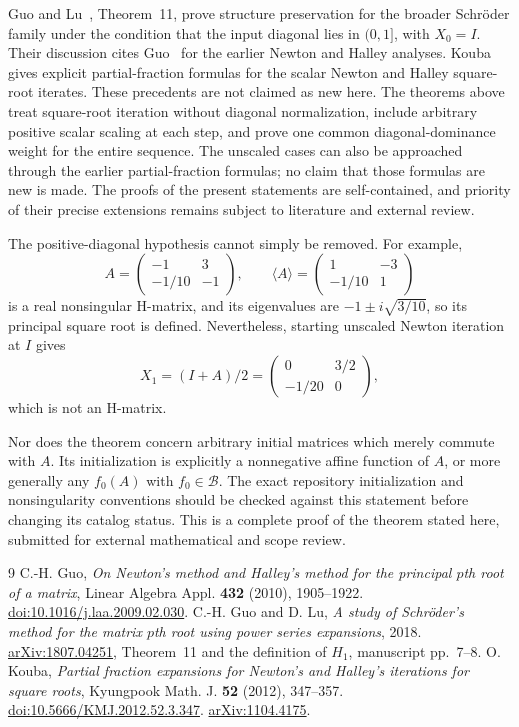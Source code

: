 \documentclass[11pt]{article}
\newcommand{\comp}[1]{\langle #1\rangle}
\begin{document}
Guo and Lu~\cite{GL}, Theorem~11, prove structure preservation for the broader Schr\"oder family under the condition that the input diagonal lies in $(0,1]$, with $X_0=I$. Their discussion cites Guo~\cite{G} for the earlier Newton and Halley analyses. Kouba~\cite{K} gives explicit partial-fraction formulas for the scalar Newton and Halley square-root iterates. These precedents are not claimed as new here. The theorems above treat square-root iteration without diagonal normalization, include arbitrary positive scalar scaling at each step, and prove one common diagonal-dominance weight for the entire sequence. The unscaled cases can also be approached through the earlier partial-fraction formulas; no claim that those formulas are new is made. The proofs of the present statements are self-contained, and priority of their precise extensions remains subject to literature and external review.

The positive-diagonal hypothesis cannot simply be removed. For example,
\[
A=\begin{pmatrix}-1&3\\-1/10&-1\end{pmatrix},\qquad
\comp A=\begin{pmatrix}1&-3\\-1/10&1\end{pmatrix}
\]
is a real nonsingular H-matrix, and its eigenvalues are $-1\pm i\sqrt{3/10}$, so its principal square root is defined. Nevertheless, starting unscaled Newton iteration at $I$ gives
\[
X_1=(I+A)/2=\begin{pmatrix}0&3/2\\-1/20&0\end{pmatrix},
\]
which is not an H-matrix.

Nor does the theorem concern arbitrary initial matrices which merely commute with $A$. Its initialization is explicitly a nonnegative affine function of $A$, or more generally any $f_0(A)$ with $f_0\in\mathcal B$. The exact repository initialization and nonsingularity conventions should be checked against this statement before changing its catalog status. This is a complete proof of the theorem stated here, submitted for external mathematical and scope review.

\begin{thebibliography}{9}
C.-H. Guo, \emph{On Newton's method and Halley's method for the principal $p$th root of a matrix}, Linear Algebra Appl. \textbf{432} (2010), 1905--1922.
\href{https://doi.org/10.1016/j.laa.2009.02.030}{doi:10.1016/j.laa.2009.02.030}.
C.-H. Guo and D. Lu, \emph{A study of Schr\"oder's method for the matrix $p$th root using power series expansions}, 2018.
\href{https://arxiv.org/abs/1807.04251}{arXiv:1807.04251}, Theorem~11 and the definition of $H_1$, manuscript pp.~7--8.
O. Kouba, \emph{Partial fraction expansions for Newton's and Halley's iterations for square roots}, Kyungpook Math. J. \textbf{52} (2012), 347--357.
\href{https://doi.org/10.5666/KMJ.2012.52.3.347}{doi:10.5666/KMJ.2012.52.3.347}.
\href{https://arxiv.org/abs/1104.4175}{arXiv:1104.4175}.
\end{thebibliography}
\end{document}
